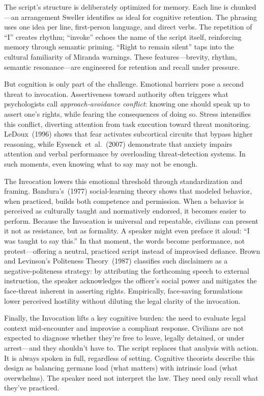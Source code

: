 The script’s structure is deliberately optimized for memory. Each line is chunked—an arrangement Sweller identifies as ideal for cognitive retention. The phrasing uses one idea per line, first‑person language, and direct verbs. The repetition of ``I'' creates rhythm; ``invoke'' echoes the name of the script itself, reinforcing memory through semantic priming. ``Right to remain silent'' taps into the cultural familiarity of Miranda warnings. These features—brevity, rhythm, semantic resonance—are engineered for retention and recall under pressure.

But cognition is only part of the challenge. Emotional barriers pose a second threat to invocation. Assertiveness toward authority often triggers what psychologists call \emph{approach‑avoidance conflict}: knowing one should speak up to assert one’s rights, while fearing the consequences of doing so. Stress intensifies this conflict, diverting attention from task execution toward threat monitoring. LeDoux (1996) shows that fear activates subcortical circuits that bypass higher reasoning, while Eysenck et al.\ (2007) demonstrate that anxiety impairs attention and verbal performance by overloading threat‑detection systems. In such moments, even knowing what to say may not be enough.

The Invocation lowers this emotional threshold through standardization and framing. Bandura’s (1977) social‑learning theory shows that modeled behavior, when practiced, builds both competence and permission. When a behavior is perceived as culturally taught and normatively endorsed, it becomes easier to perform. Because the Invocation is universal and repeatable, civilians can present it not as resistance, but as formality. A speaker might even preface it aloud: ``I was taught to say this.'' In that moment, the words become performance, not protest—offering a neutral, practiced script instead of improvised defiance. Brown and Levinson’s Politeness Theory (1987) classifies such disclaimers as a negative‑politeness strategy: by attributing the forthcoming speech to external instruction, the speaker acknowledges the officer’s social power and mitigates the face‑threat inherent in asserting rights. Empirically, face‑saving formulations lower perceived hostility without diluting the legal clarity of the invocation.

Finally, the Invocation lifts a key cognitive burden: the need to evaluate legal context mid‑encounter and improvise a compliant response. Civilians are not expected to diagnose whether they’re free to leave, legally detained, or under arrest—and they shouldn’t have to. The script replaces that analysis with action. It is always spoken in full, regardless of setting. Cognitive theorists describe this design as balancing germane load (what matters) with intrinsic load (what overwhelms). The speaker need not interpret the law. They need only recall what they’ve practiced.

